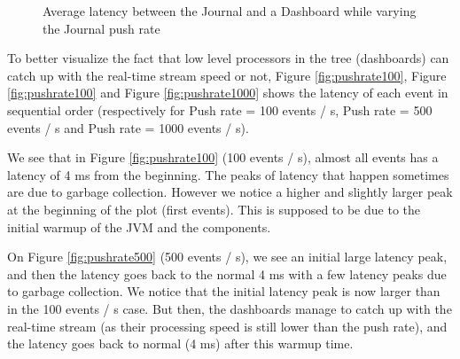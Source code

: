 \begin{figure}
  \begin{center} 
    \caption{Average latency between the Journal and a Dashboard while varying the Journal push rate}
    \label{fig:latencyplot}
  \end{center}
\end{figure}

To better visualize the fact that low level processors in the tree (dashboards) can catch up with the real-time stream speed or not, Figure \ref{fig:pushrate100}, Figure \ref{fig:pushrate100} and Figure \ref{fig:pushrate1000} shows the latency of each event in sequential order (respectively for Push rate = 100 events / s, Push rate = 500 events / s and Push rate = 1000 events / s). 

We see that in Figure \ref{fig:pushrate100} (100 events / s), almost all events has a latency of 4 ms from the beginning. The peaks of latency that happen sometimes are due to garbage collection. However we notice a higher and slightly larger peak at the beginning of the plot (first events). This is supposed to be due to the initial warmup of the JVM and the components.

On Figure \ref{fig:pushrate500} (500 events / s), we see an initial large latency peak, and then the latency goes back to the normal 4 ms with a few latency peaks due to garbage collection. We notice that the initial latency peak is now larger than in the 100 events / s case. But then, the dashboards manage to catch up with the real-time stream (as their processing speed is still lower than the push rate), and the latency goes back to normal (4 ms) after this warmup time.

